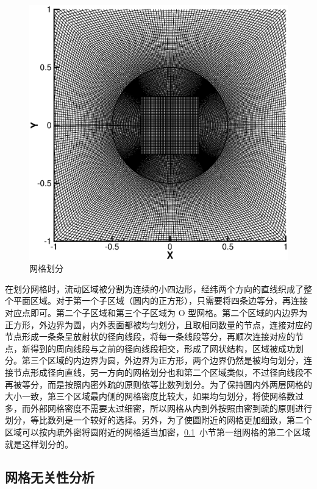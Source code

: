 \begin{figure}
	\centering
	\includegraphics[scale=.7]{figs/grid2}
	\caption{网格划分}\label{fig: grid2}
\end{figure}

在划分网格时，流动区域被分割为连续的小四边形，经纬两个方向的直线织成了整个平面区域。对于第一个子区域（圆内的正方形），只需要将四条边等分，再连接对应点即可。第二个子区域和第三个子区域为 O 型网格。第二个区域的内边界为正方形，外边界为圆，内外表面都被均匀划分，且取相同数量的节点，连接对应的节点形成一条条呈放射状的径向线段，将每一条线段等分，再顺次连接对应的节点，新得到的周向线段与之前的径向线段相交，形成了网状结构，区域被成功划分。第三个区域的内边界为圆，外边界为正方形，两个边界仍然是被均匀划分，连接节点形成径向直线，另一方向的网格划分也和第二个区域类似，不过径向线段不再被等分，而是按照内密外疏的原则依等比数列划分。为了保持圆内外两层网格的大小一致，第三个区域最内侧的网格密度比较大，如果均匀划分，将使网格数过多，而外部网格密度不需要太过细密，所以网格从内到外按照由密到疏的原则进行划分，等比数列是一个较好的选择。另外，为了使圆附近的网格更加细致，第二个区域可以按内疏外密将圆附近的网格适当加密，\ref{subsec: grid-independent}~小节第一组网格的第二个区域就是这样划分的。

\subsection{网格无关性分析}\label{subsec: grid-independent}

